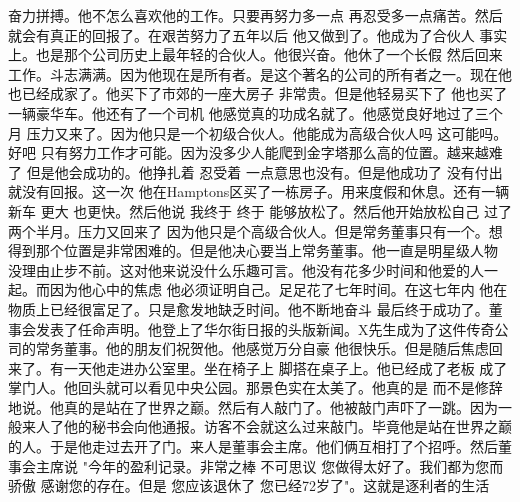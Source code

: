 奋力拼搏。他不怎么喜欢他的工作。只要再努力多一点 再忍受多一点痛苦。然后就会有真正的回报了。在艰苦努力了五年以后 他又做到了。他成为了合伙人 事实上。也是那个公司历史上最年轻的合伙人。他很兴奋。他休了一个长假 然后回来工作。斗志满满。因为他现在是所有者。是这个著名的公司的所有者之一。现在他也已经成家了。他买下了市郊的一座大房子 非常贵。但是他轻易买下了 他也买了一辆豪华车。他还有了一个司机 他感觉真的功成名就了。他感觉良好地过了三个月 压力又来了。因为他只是一个初级合伙人。他能成为高级合伙人吗 这可能吗。好吧 只有努力工作才可能。因为没多少人能爬到金字塔那么高的位置。越来越难了 但是他会成功的。他挣扎着 忍受着 一点意思也没有。但是他成功了 没有付出 就没有回报。这一次 他在Hamptons区买了一栋房子。用来度假和休息。还有一辆新车 更大 也更快。然后他说 我终于 终于 能够放松了。然后他开始放松自己 过了两个半月。压力又回来了 因为他只是个高级合伙人。但是常务董事只有一个。想得到那个位置是非常困难的。但是他决心要当上常务董事。他一直是明星级人物 没理由止步不前。这对他来说没什么乐趣可言。他没有花多少时间和他爱的人一起。而因为他心中的焦虑 他必须证明自己。足足花了七年时间。在这七年内 他在物质上已经很富足了。只是愈发地缺乏时间。他不断地奋斗 最后终于成功了。董事会发表了任命声明。他登上了华尔街日报的头版新闻。X先生成为了这件传奇公司的常务董事。他的朋友们祝贺他。他感觉万分自豪 他很快乐。但是随后焦虑回来了。有一天他走进办公室里。坐在椅子上 脚搭在桌子上。他已经成了老板 成了掌门人。他回头就可以看见中央公园。那景色实在太美了。他真的是 而不是修辞地说。他真的是站在了世界之巅。然后有人敲门了。他被敲门声吓了一跳。因为一般来人了他的秘书会向他通报。访客不会就这么过来敲门。毕竟他是站在世界之巅的人。于是他走过去开了门。来人是董事会主席。他们俩互相打了个招呼。然后董事会主席说 "今年的盈利记录。非常之棒 不可思议 您做得太好了。我们都为您而骄傲 感谢您的存在。但是 您应该退休了 您已经72岁了"。这就是逐利者的生活 
%
